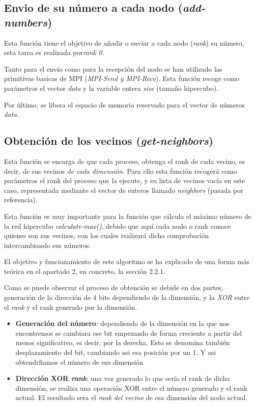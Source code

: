 \documentclass[11pt]{article}
\begin{document}





\subsection{Envio de su número a cada nodo (\textit{add-numbers})}
Esta función tiene el objetivo de añadir o enviar a cada nodo (\textit{rank}) su número, esta tarea es realizada por\textit{rank 0}.

Tanto para el envio como para la recepción del nodo se han utilizado las primitivas basicas de MPI (\textit{MPI-Send y MPI-Recv}).
Esta función recoge como parámetros el vector \textit{data} y la variable entera \textit{size} (tamaño hipercubo).



Por último, se libera el espacio de memoria reservado para el vector de números \textit{data}.


\subsection{Obtención de los vecinos (\textit{get-neighbors})}
Esta función se encarga de que cada proceso, obtenga el rank de cada vecino, es decir, de sus vecinos \textit{de cada dimensión}. Para ello esta función recogerá como parámetros el rank del proceso que la ejecute, y su lista de vecinos vacía en este caso, representada mediante el vector de enteros llamado \textit{neighbors} (pasada por referencia).

Esta función es muy importante para la función que cálcula el máximo número de la red hipercubo \textit{calculate-max()}, debido que aquí cada nodo o rank conoce quienes son sus vecinos, con los cuales realizará dicha comprobación intercambiando sus números.

El objetivo y funcionamiento de este algoritmo se ha explicado de una forma más teórica en el apartado 2, en concreto, la sección 2.2.1.



Como se puede observar el proceso de obtención se debide en dos partes, generación de la dirección de 4 bits dependiendo de la dimensión, y la \textit{XOR} entre el \textit{rank} y el rank generado por la dimensión.

\begin{itemize}
	\item \textbf{Generación del número}: dependiendo de la dimensión en la que nos encontremos se cambiara ese bit empezando de forma creciente a partir del menos significativo, es decir, por la derecha. Esto se denomina también desplazamiento del bit, cambiando asi esa posición por un 1. Y asi obtendrfiamos el número de esa dimensión
	\item \textbf{Dirección XOR \textit{rank}}: una vez generado lo que sería el rank de dicha dimensión, se realiza una operación XOR entre el número generado y el rank actual. El resultado sera el \textit{rank del vecino} de esa dimensión del nodo actual.
\end{itemize}
\end{document}

